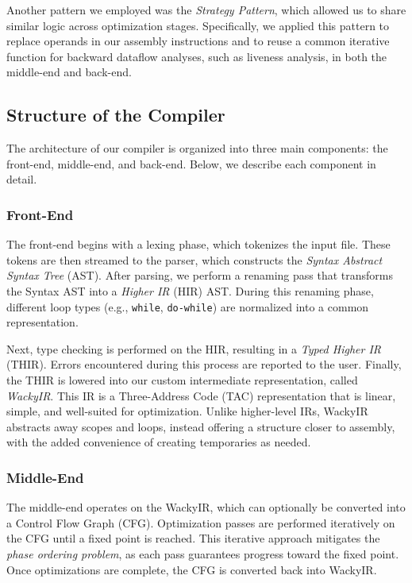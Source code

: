 \documentclass[11pt,a4paper]{article}
\begin{document}
Another pattern we employed was the \textit{Strategy Pattern}, which allowed us to share similar logic across optimization stages. Specifically, we applied this pattern to replace operands in our assembly instructions and to reuse a common iterative function for backward dataflow analyses, such as liveness analysis, in both the middle-end and back-end.

\subsection{Structure of the Compiler}

The architecture of our compiler is organized into three main components: the front-end, middle-end, and back-end. Below, we describe each component in detail.

\subsubsection{Front-End}

The front-end begins with a lexing phase, which tokenizes the input file. These tokens are then streamed to the parser, which constructs the \textit{Syntax Abstract Syntax Tree} (AST). After parsing, we perform a renaming pass that transforms the Syntax AST into a \textit{Higher IR} (HIR) AST. During this renaming phase, different loop types (e.g., \texttt{while}, \texttt{do-while}) are normalized into a common representation.

Next, type checking is performed on the HIR, resulting in a \textit{Typed Higher IR} (THIR). Errors encountered during this process are reported to the user. Finally, the THIR is lowered into our custom intermediate representation, called \textit{WackyIR}. This IR is a Three-Address Code (TAC) representation that is linear, simple, and well-suited for optimization. Unlike higher-level IRs, WackyIR abstracts away scopes and loops, instead offering a structure closer to assembly, with the added convenience of creating temporaries as needed.

\subsubsection{Middle-End}

The middle-end operates on the WackyIR, which can optionally be converted into a Control Flow Graph (CFG). Optimization passes are performed iteratively on the CFG until a fixed point is reached. This iterative approach mitigates the \textit{phase ordering problem}, as each pass guarantees progress toward the fixed point. Once optimizations are complete, the CFG is converted back into WackyIR.
\end{document}
